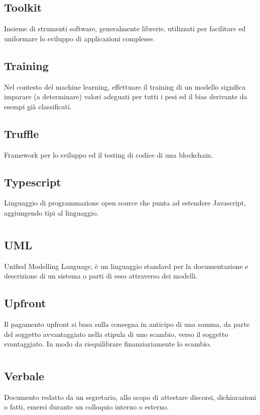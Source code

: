 	\subsection*{Toolkit}
	Insieme di strumenti software, generalmente librerie, utilizzati per facilitare ed uniformare lo sviluppo di applicazioni complesse.
	\subsection*{Training}
	Nel contesto del machine learning, effettuare il training di un modello significa imparare (a determinare) valori adeguati per tutti i pesi ed il bias derivante da esempi già classificati.
	\subsection*{Truffle}
	Framework per lo sviluppo ed il testing di codice di una blockchain. 
	\subsection*{Typescript}
	Linguaggio di programmazione open source che punta ad estendere Javascript, aggiungendo tipi al linguaggio.
\pagebreak
\section{}
	\subsection*{UML}
	Unified Modelling Language, è un linguaggio  standard per la documentazione e descrizione di un sistema o parti di esso attraverso dei modelli.
	\subsection*{Upfront}
	Il pagamento upfront si basa sulla consegna in anticipo di una somma, da parte del soggetto avvantaggiato nella stipula di uno scambio, verso il soggetto svantaggiato. In modo da riequilibrare finanziariamente lo scambio.
\pagebreak
\section{}
	\subsection*{Verbale}
	Documento redatto da un segretario, allo scopo di attestare discorsi, dichiarazioni o fatti, emersi durante un colloquio interno o esterno.
